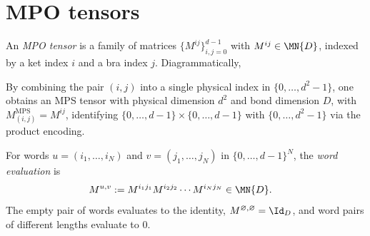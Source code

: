 \section{MPO tensors}

\begin{definition}\label{def:mpo_tensor}
    \leanok
    An \emph{MPO tensor} is a family of matrices
    $\{M^{ij}\}_{i,j=0}^{d-1}$ with $M^{ij} \in \MN{D}$, indexed by a ket
    index $i$ and a bra index $j$. Diagrammatically,
    \begin{center}
        \tenkzkernel
        \begin{tenkz}[rows={wire}, cols=1, west=open, east=open]
        \end{tenkz}
    \end{center}
\end{definition}

\begin{definition}\label{def:mpo_to_mps}
    \leanok
    By combining the pair $(i,j)$ into a single physical index in
    $\{0,\ldots,d^2-1\}$, one obtains an MPS tensor with physical dimension
    $d^2$ and bond dimension $D$, with
    $M^{\mathrm{MPS}}_{(i,j)}=M^{ij}$, identifying
    $\{0,\ldots,d{-}1\}\times\{0,\ldots,d{-}1\}$ with
    $\{0,\ldots,d^2{-}1\}$ via the product encoding.
\end{definition}

\begin{definition}\label{def:mpo_eval_word}
    \leanok
    For words $u=(i_1,\ldots,i_N)$ and $v=(j_1,\ldots,j_N)$ in
    $\{0,\ldots,d{-}1\}^N$, the \emph{word evaluation} is
    \begin{align}
        M^{u,v}
         & :=M^{i_1j_1}M^{i_2j_2}\cdots M^{i_Nj_N}\in\MN{D}.
        \label{eq:mpdo_word_eval}
    \end{align}
    The empty pair of words evaluates to the identity,
    $M^{\varnothing,\varnothing}=\Id_D$, and word pairs of different
    lengths evaluate to $0$.
\end{definition}

